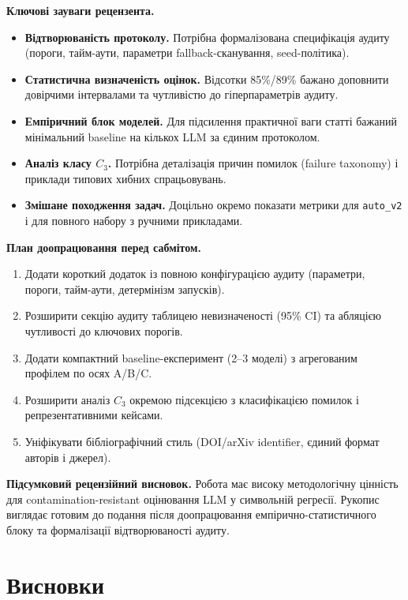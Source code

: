 \documentclass[11pt]{article}
\begin{document}
\textbf{Ключові зауваги рецензента.}
\begin{itemize}[leftmargin=1.5em]
  \item \textbf{Відтворюваність протоколу.} Потрібна формалізована специфікація аудиту (пороги, тайм-аути, параметри fallback-сканування, seed-політика).
  \item \textbf{Статистична визначеність оцінок.} Відсотки 85\%/89\% бажано доповнити довірчими інтервалами та чутливістю до гіперпараметрів аудиту.
  \item \textbf{Емпіричний блок моделей.} Для підсилення практичної ваги статті бажаний мінімальний baseline на кількох LLM за єдиним протоколом.
  \item \textbf{Аналіз класу $C_3$.} Потрібна деталізація причин помилок (failure taxonomy) і приклади типових хибних спрацьовувань.
  \item \textbf{Змішане походження задач.} Доцільно окремо показати метрики для \texttt{auto\_v2} і для повного набору з ручними прикладами.
\end{itemize}

\textbf{План доопрацювання перед сабмітом.}
\begin{enumerate}[leftmargin=1.5em]
  \item Додати короткий додаток із повною конфігурацією аудиту (параметри, пороги, тайм-аути, детермінізм запусків).
  \item Розширити секцію аудиту таблицею невизначеності (95\% CI) та абляцією чутливості до ключових порогів.
  \item Додати компактний baseline-експеримент (2--3 моделі) з агрегованим профілем по осях A/B/C.
  \item Розширити аналіз $C_3$ окремою підсекцією з класифікацією помилок і репрезентативними кейсами.
  \item Уніфікувати бібліографічний стиль (DOI/arXiv identifier, єдиний формат авторів і джерел).
\end{enumerate}

\textbf{Підсумковий рецензійний висновок.}
Робота має високу методологічну цінність для contamination-resistant оцінювання LLM у символьній регресії. Рукопис виглядає готовим до подання після доопрацювання емпірично-статистичного блоку та формалізації відтворюваності аудиту.

\section*{Висновки}
\end{document}
